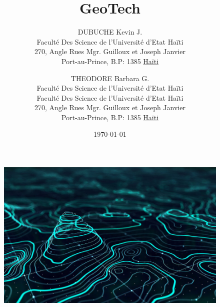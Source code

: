 \documentclass[a4paper,12pt]{report}
\begin{document}
\begin{figure}[t]
        \centering
        \includegraphics[width=1\textwidth]{GIS}
        \label{image-GIS}
        \end{figure}

\title{GeoTech}
\author{
        DUBUCHE Kevin J. \\
        Faculté Des Science de l'Université d'Etat Haïti\\
        270, Angle Rues Mgr. Guilloux et Joseph Janvier\\
        Port-au-Prince, B.P: 1385 \underline{Haïti}
        \and
        THEODORE Barbara G.\\
        Faculté Des Science de l'Université d'Etat Haïti\\
        Faculté Des Science de l'Université d'Etat Haïti\\
        270, Angle Rues Mgr. Guilloux et Joseph Janvier \\
        Port-au-Prince, B.P: 1385  \underline{Haïti}
}
\date{\today}
\maketitle

\tableofcontents











    
\end{document}
